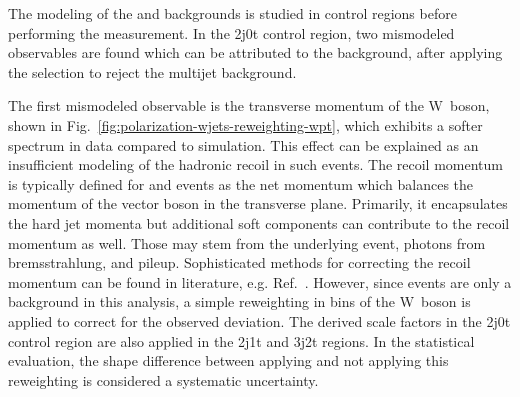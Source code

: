 The modeling of the \wjets and \ttbar backgrounds is studied in control regions before performing the measurement. In the 2j0t control region, two mismodeled observables are found which can be attributed to the \wjets background, after applying the \bdtqcd selection to reject the multijet background. 

The first mismodeled observable is the transverse momentum of the W~boson, shown in Fig.~\ref{fig:polarization-wjets-reweighting-wpt}, which exhibits a softer spectrum in data compared to simulation. This effect can be explained as an insufficient modeling of the hadronic recoil in such events. The recoil momentum is typically defined for \zjets and \wjets events as the net momentum which balances the momentum of the vector boson in the transverse plane. Primarily, it encapsulates the hard jet momenta but additional soft components can contribute to the recoil momentum as well. Those may stem from the underlying event, photons from bremsstrahlung, and pileup. Sophisticated methods for correcting the recoil momentum can be found in literature, e.g. Ref.~\cite{Abazov:2009tra}. However, since \wjets events are only a background in this analysis, a simple reweighting in bins of the W~boson \pt is applied to correct for the observed deviation. The derived scale factors in the 2j0t control region are also applied in the 2j1t and 3j2t regions. In the statistical evaluation, the shape difference between applying and not applying this reweighting is considered a systematic uncertainty.


